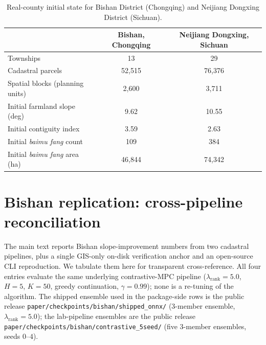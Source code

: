 \documentclass[11pt]{article}
\begin{document}
\begin{table}[htbp]
\centering
\small
\caption{Real-county initial state for Bishan District (Chongqing) and Neijiang Dongxing District (Sichuan).}
\label{tab:si-counties}
\begin{tabular}{lcc}
\toprule
 & Bishan, Chongqing & Neijiang Dongxing, Sichuan \\
\midrule
Townships                                & 13       & 29       \\
Cadastral parcels                        & 52{,}515 & 76{,}376 \\
Spatial blocks (planning units)          & 2{,}600  & 3{,}711  \\
Initial farmland slope (deg)             & 9.62     & 10.55    \\
Initial contiguity index                 & 3.59     & 2.63     \\
Initial \textit{baimu fang} count        & 109      & 384      \\
Initial \textit{baimu fang} area (ha)    & 46{,}844 & 74{,}342 \\
\bottomrule
\end{tabular}
\end{table}

\section{Bishan replication: cross-pipeline reconciliation}\label{si:bishan-regimes}

The main text reports Bishan slope-improvement numbers from two cadastral pipelines, plus a single GIS-only on-disk verification anchor and an open-source CLI reproduction. We tabulate them here for transparent cross-reference. All four entries evaluate the same underlying contrastive-MPC pipeline (\(\lambda_{\text{rank}}{=}5.0\), $H{=}5$, $K{=}50$, greedy continuation, $\gamma{=}0.99$); none is a re-tuning of the algorithm. The shipped ensemble used in the package-side rows is the public release \texttt{paper/checkpoints/bishan/shipped\_onnx/} (3-member ensemble, $\lambda_{\text{rank}}{=}5.0$); the lab-pipeline ensembles are the public release \texttt{paper/checkpoints/bishan/contrastive\_5seed/} (five 3-member ensembles, seeds $0$--$4$).
\end{document}
